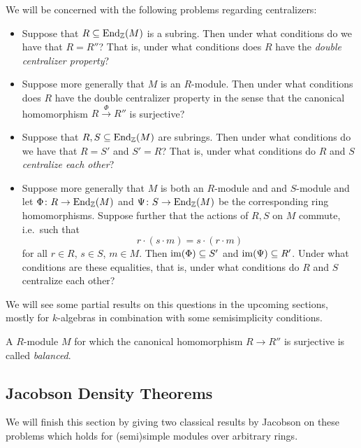 \begin{fluff}
  We will be concerned with the following problems regarding centralizers:
  \begin{itemize}
    \item
      Suppose that $R \subseteq \operatorname{End}_{\mathbb{Z}}(M)$ is a subring.
      Then under what conditions do we have that $R = R''$?
      That is, under what conditions does $R$ have the \emph{double centralizer property}?
    \item
      Suppose more generally that $M$ is an $R$-module.
      Then under what conditions does $R$ have the double centralizer property in the sense that the canonical homomorphism $R \xrightarrow{\Phi} R''$ is surjective?
    \item
      Suppose that $R, S \subseteq \operatorname{End}_{\mathbb{Z}}(M)$ are subrings.
      Then under what conditions do we have that $R = S'$ and $S' = R$?
      That is, under what conditions do $R$ and $S$ \emph{centralize each other}?
    \item
      Suppose more generally that $M$ is both an $R$-module and and $S$-module and let $\Phi \colon R \to \operatorname{End}_{\mathbb{Z}}(M)$ and $\Psi \colon S \to \operatorname{End}_{\mathbb{Z}}(M)$ be the corresponding ring homomorphisms.
      Suppose further that the actions of $R, S$ on $M$ commute, i.e.\ such that
      \[
          r \cdot (s \cdot m)
        = s \cdot (r \cdot m)
      \]
      for all $r \in R$, $s \in S$, $m \in M$.
      Then $\operatorname{im}(\Phi) \subseteq S'$ and $\operatorname{im}(\Psi) \subseteq R'$.
      Under what conditions are these equalities, that is, under what conditions do $R$ and $S$ centralize each other?
  \end{itemize}
  
  We will see some partial results on this questions in the upcoming sections, mostly for $k$-algebras in combination with some semisimplicity conditions.
\end{fluff}


\begin{remark}
  A $R$-module $M$ for which the canonical homomorphism $R \to R''$ is surjective is called \emph{balanced}.
\end{remark}





\subsection{Jacobson Density Theorems}
\label{subsection: Jacobson Density Theorems}


\begin{fluff}
  We will finish this section by giving two classical results by Jacobson on these problems which holds for (semi)simple modules over arbitrary rings.
\end{fluff}


